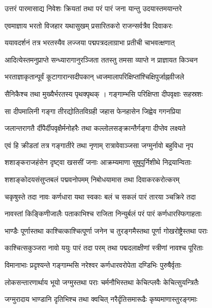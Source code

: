 \twolineshloka
{उत्तरं पारमासाद्य निवेशः क्रियतां तथा}
{परं पारं जना यान्तु उदयास्तमयान्तरे}%

\twolineshloka
{एवमाज्ञाय भरतो विजहार यथासुखम्}
{प्रसारितकरो राजन्सर्वत्रैव दिवाकरः}%

\twolineshloka
{ययावदर्शनं तत्र भरतस्यैव लज्जया}
{पद्मपत्रदलाग्राभा प्रतीची चाभवत्क्षणात्}%

\twolineshloka
{आदित्येस्तमनुप्राप्ते सन्ध्यारागानुरञ्जिता}
{ततस्तु तमसा व्याप्ते न प्राज्ञायत किञ्चन}%

\twolineshloka
{भरताज्ञाकृतान्पूर्वं कूटागारान्सदीपकान्}
{ध्वजमालापरिक्षिप्तांश्चिक्षिपुर्जाह्नवीजले}%

\twolineshloka
{सैनिकैश्च तथा मुख्यैर्भरतस्य पृथक्पृथक् ।}
{गङ्गाम्भसि परिक्षिप्ता दीपवृक्षाः सहस्रशः}%

\twolineshloka
{सा दीपमालिनी गङ्गा तीरद्योतितविग्रही}
{जहास फेनहासेन जिह्वेव गगनप्रिया}%

\twolineshloka
{जलान्तरागतै र्दीपैर्दीपवृक्षैर्मनोहरैः}
{तथा कल्लोलसङ्क्रान्तैर्गङ्गा दीप्तेव लक्ष्यते}%

\twolineshloka
{एवं हि क्रीडतां तत्र गङ्गातीरे तथा नृणाम्}
{रात्रावेवाञ्जसा जग्मुर्नावो बहुविधा नृप}%

\twolineshloka
{शशाङ्कराजहंसेन दृष्ट्वा खससीं जनाः}
{आक्रम्यमाणा सुषुपुर्निशीथे निद्रयान्विताः} %

\twolineshloka
{शशाङ्कोदयसंसुप्तबलं पद्मवनोपमम्}
{निबोधयामास तथा दिवाकरकरोत्करम्}%

\twolineshloka
{चकृषुस्ते तदा नावः कर्णधारा यथा स्वकाः}
{बलं च सकलं पारं तारया ञ्चक्रिरे तदा}%

\twolineshloka
{नावस्तां किङ्किणीजालैः पताकाभिश्च राजिता}
{निन्युर्बलं परं पारं कर्णधारस्फिगाहताः}%

\twolineshloka
{भाण्डैः पूर्णास्तथा काश्चित्काश्चित्पूर्णा जनेन च}
{तुरङ्गमैस्तथा पूर्णा गोखरोष्ट्रैस्तथा पराः}%

\twolineshloka
{काश्चित्सकुञ्जरा नावो ययुः पारं तदा परम्}
{तथा पद्मदलाक्षीणां स्त्रीणां नावश्च पूरिताः}%

\twolineshloka
{विमानाभाः प्रदृश्यन्ते गङ्गाम्भसि नरेश्वर}
{कर्णधारवरोपेता दण्डिभिः पुरुषैर्वृताः}%

\twolineshloka
{लोकसन्तारणार्थाय भूयो जग्मुस्तथा पराः}
{चर्मनौभिस्तथा केचित्प्लवैः केचित्सुयन्त्रितैः}%

\twolineshloka
{जग्मुरादाय भाण्डानि दृतिभिश्च तथा क्वचित्}
{नरैर्दृतिसमारूढैः कृष्यमाणास्तुरङ्गमाः}%

